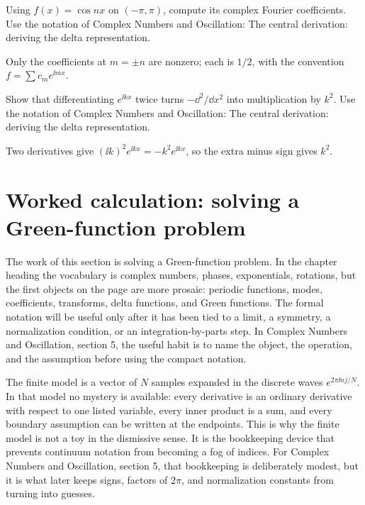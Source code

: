 \begin{exercise}
Using \(f(x)=\cos nx\) on \((-\pi,\pi)\), compute its complex Fourier coefficients.  Use the notation of Complex Numbers and Oscillation: The central derivation: deriving the delta representation.
\begin{answer}
Only the coefficients at \(m=\pm n\) are nonzero; each is \(1/2\), with the convention \(f=\sum c_me^{\ii mx}\).
\end{answer}
\end{exercise}

\begin{exercise}
Show that differentiating \(e^{\ii kx}\) twice turns \(-\dd^2/\dd x^2\) into multiplication by \(k^2\).  Use the notation of Complex Numbers and Oscillation: The central derivation: deriving the delta representation.
\begin{answer}
Two derivatives give \((\ii k)^2e^{\ii kx}=-k^2e^{\ii kx}\), so the extra minus sign gives \(k^2\).
\end{answer}
\end{exercise}



\section{Worked calculation: solving a Green-function problem}

The work of this section is solving a Green-function problem.  In the chapter heading the vocabulary is complex numbers, phases, exponentials, rotations, but the first objects on the page are more prosaic: periodic functions, modes, coefficients, transforms, delta functions, and Green functions.  The formal notation will be useful only after it has been tied to a limit, a symmetry, a normalization condition, or an integration-by-parts step.  In Complex Numbers and Oscillation, section 5, the useful habit is to name the object, the operation, and the assumption before using the compact notation.

The finite model is a vector of \(N\) samples expanded in the discrete waves \(e^{2\pi \ii nj/N}\).  In that model no mystery is available: every derivative is an ordinary derivative with respect to one listed variable, every inner product is a sum, and every boundary assumption can be written at the endpoints.  This is why the finite model is not a toy in the dismissive sense.  It is the bookkeeping device that prevents continuum notation from becoming a fog of indices.  For Complex Numbers and Oscillation, section 5, that bookkeeping is deliberately modest, but it is what later keeps signs, factors of \(2\pi\), and normalization constants from turning into guesses.

